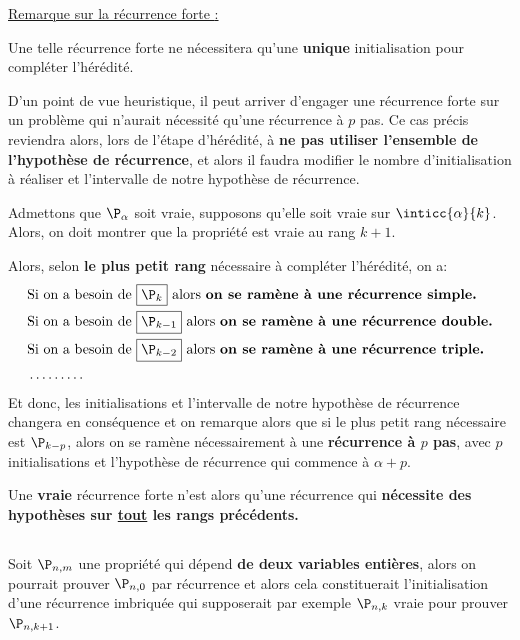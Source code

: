 \underline{Remarque sur la récurrence forte {:}}\<

Une telle récurrence forte ne nécessitera qu'une \textbf{unique} initialisation pour compléter l'hérédité.\<

D'un point de vue heuristique, il peut arriver d'engager une récurrence forte sur un problème qui n'aurait nécessité qu'une récurrence à \(p\) pas.\+
Ce cas précis reviendra alors, lors de l'étape d'hérédité, à \textbf{ne pas utiliser l'ensemble de l'hypothèse de récurrence}, et alors il faudra modifier le nombre d'initialisation à réaliser et l'intervalle de notre hypothèse de récurrence.\<

Admettons que \(\P_\alpha\) soit vraie, supposons qu'elle soit vraie sur \(\inticc{\alpha}{k}\). Alors, on doit montrer que la propriété est vraie au rang \(k + 1\).\<

Alors, selon \textbf{le plus petit rang} nécessaire à compléter l'hérédité, on a:
\begin{align*}
    & \text{Si on a besoin de }\boxed{\P_k} \text{ alors \textbf{on se ramène à une récurrence simple.}}\\
    & \text{Si on a besoin de }\boxed{\P_{k-1}} \text{ alors \textbf{on se ramène à une récurrence double.}}\\
    & \text{Si on a besoin de }\boxed{\P_{k-2}} \text{ alors \textbf{on se ramène à une récurrence triple.}}\\
    & \ldots\ldots\ldots
\end{align*}
Et donc, les initialisations et l'intervalle de notre hypothèse de récurrence changera en conséquence et on remarque alors que si le plus petit rang nécessaire est \(\P_{k-p}\), alors on se ramène nécessairement à une \textbf{récurrence à \(p\) pas}, avec \(p\) initialisations et l'hypothèse de récurrence qui commence à \(\alpha + p\).\<

Une \textbf{vraie} récurrence forte n'est alors qu'une récurrence qui \textbf{nécessite des hypothèses sur \underline{tout} les rangs précédents.}
   
\subsection*{}
Soit \(\P_{n,m}\) une propriété qui dépend \textbf{de deux variables entières}, alors on pourrait prouver \(\P_{n, 0}\) par récurrence et alors cela constituerait l'initialisation d'une récurrence imbriquée qui supposerait par exemple \(\P_{n, k}\) vraie pour prouver \(\P_{n, k+1}\).

